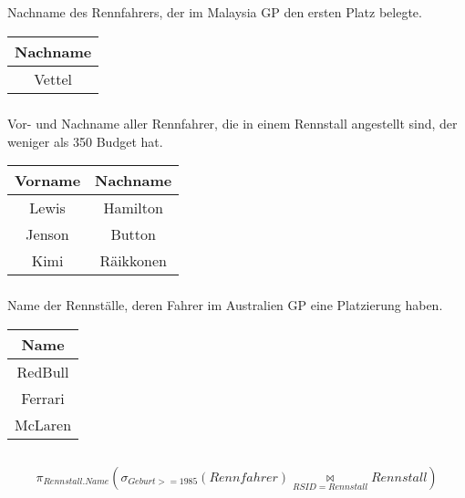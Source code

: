 \documentclass[ngerman]{gdb-aufgabenblatt}
\begin{document}
	\subsection{} %
		\subsubsection{} %
			Nachname des Rennfahrers, der im Malaysia GP den ersten Platz belegte.
			
			\begin{tabular}{c}
				Nachname \\
				\hline
				Vettel \\
				\hline
			\end{tabular}
		\subsubsection{} %
			Vor- und Nachname aller Rennfahrer, die in einem Rennstall angestellt sind, der weniger als 350 Budget hat.
			
			\begin{tabular}{c|c}
				Vorname & Nachname \\
				\hline
				Lewis & Hamilton \\
				Jenson & Button \\
				Kimi & Räikkonen \\
				\hline
			\end{tabular}
		\subsubsection{} %
			Name der Rennställe, deren Fahrer im Australien GP eine Platzierung haben.
			
			\begin{tabular}{c}
				Name \\
				\hline
				RedBull \\
				Ferrari \\
				McLaren \\
				\hline
			\end{tabular}
	\subsection{} %
		\subsubsection{} %
			\[
				\pi_{Rennstall.Name}(\sigma_{Geburt >= 1985}(Rennfahrer) \underset{RSID=Rennstall}{\bowtie} Rennstall) 
			\]
			
\end{document}
